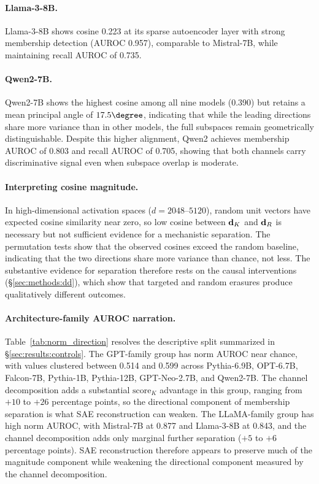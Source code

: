 \paragraph{Llama-3-8B.}
Llama-3-8B shows cosine 0.223 at its sparse autoencoder layer with strong membership detection (AUROC 0.957), comparable to Mistral-7B, while maintaining recall AUROC of 0.735.

\paragraph{Qwen2-7B.}
Qwen2-7B shows the highest cosine among all nine models (0.390) but retains a mean principal angle of $17.5\degree$, indicating that while the leading directions share more variance than in other models, the full subspaces remain geometrically distinguishable.
Despite this higher alignment, Qwen2 achieves membership AUROC of 0.803 and recall AUROC of 0.705, showing that both channels carry discriminative signal even when subspace overlap is moderate.

\paragraph{Interpreting cosine magnitude.}
In high-dimensional activation spaces ($d = 2048$--$5120$), random unit vectors have expected cosine similarity near zero, so low cosine between $\mathbf{d}_K$ and $\mathbf{d}_R$ is necessary but not sufficient evidence for a mechanistic separation.
The permutation tests show that the observed cosines exceed the random baseline, indicating that the two directions share more variance than chance, not less.
The substantive evidence for separation therefore rests on the causal interventions (\S\ref{sec:methods:dd}), which show that targeted and random erasures produce qualitatively different outcomes.

\paragraph{Architecture-family AUROC narration.}
Table~\ref{tab:norm_direction} resolves the descriptive split summarized in \S\ref{sec:results:controls}. The GPT-family group has norm AUROC near chance, with values clustered between 0.514 and 0.599 across Pythia-6.9B, OPT-6.7B, Falcon-7B, Pythia-1B, Pythia-12B, GPT-Neo-2.7B, and Qwen2-7B. The channel decomposition adds a substantial $\mathrm{score}_K$ advantage in this group, ranging from $+10$ to $+26$ percentage points, so the directional component of membership separation is what SAE reconstruction can weaken. The LLaMA-family group has high norm AUROC, with Mistral-7B at 0.877 and Llama-3-8B at 0.843, and the channel decomposition adds only marginal further separation ($+5$ to $+6$ percentage points). SAE reconstruction therefore appears to preserve much of the magnitude component while weakening the directional component measured by the channel decomposition.

